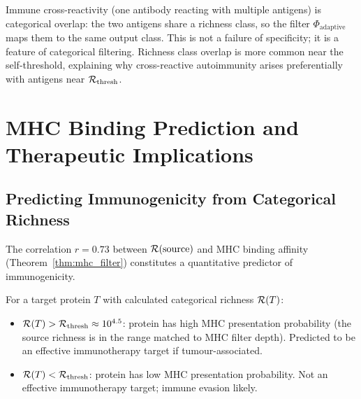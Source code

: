 \begin{remark}
Immune cross-reactivity (one antibody reacting with multiple antigens) is
categorical overlap: the two antigens share a richness class, so the filter
$\Phi_{\mathrm{adaptive}}$ maps them to the same output class. This is not a
failure of specificity; it is a feature of categorical filtering. Richness
class overlap is more common near the self-threshold, explaining why
cross-reactive autoimmunity arises preferentially with antigens near
$\mathcal{R}_{\mathrm{thresh}}$.
\end{remark}

\section{MHC Binding Prediction and Therapeutic Implications}
\label{sec:mhc_prediction}

\subsection{Predicting Immunogenicity from Categorical Richness}

The correlation $r = 0.73$ between $\mathcal{R}(\text{source})$ and MHC binding
affinity (Theorem~\ref{thm:mhc_filter}) constitutes a quantitative predictor
of immunogenicity.

\begin{proposition}
\label{prop:immunogenicity}
For a target protein $T$ with calculated categorical richness $\mathcal{R}(T)$:
\begin{itemize}
  \item $\mathcal{R}(T) > \mathcal{R}_{\mathrm{thresh}} \approx 10^{4.5}$: protein has
        high MHC presentation probability (the source richness is in the range
        matched to MHC filter depth). Predicted to be an effective immunotherapy
        target if tumour-associated.
  \item $\mathcal{R}(T) < \mathcal{R}_{\mathrm{thresh}}$: protein has low MHC presentation
        probability. Not an effective immunotherapy target; immune evasion likely.
\end{itemize}
\end{proposition}

